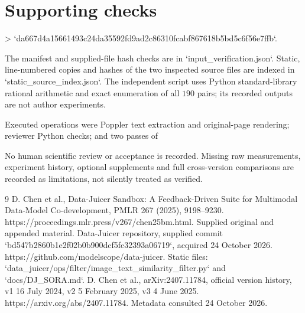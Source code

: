 \documentclass[10pt]{article}
\begin{document}
\section*{Supporting checks}
> `da667d4a15661493c24da35592fd9ad2c86310fcabf867618b5bd5c6f56e7ffb`.\par
The manifest and supplied-file hash checks are in `input\_verification.json`. Static, line-numbered copies and hashes of the two inspected source files are indexed in `static\_source\_index.json`. The independent script uses Python standard-library rational arithmetic and exact enumeration of all \(190\) pairs; its recorded outputs are not author experiments.\par
Executed operations were Poppler text extraction and original-page rendering; reviewer Python checks; and two passes of\par
No human scientific review or acceptance is recorded. Missing raw measurements, experiment history, optional supplements and full cross-version comparisons are recorded as limitations, not silently treated as verified.\par
9 D. Chen et al., Data-Juicer Sandbox: A Feedback-Driven Suite for Multimodal Data-Model Co-development, PMLR 267 (2025), 9198–9230. https://proceedings.mlr.press/v267/chen25bm.html. Supplied original and appended material. Data-Juicer repository, supplied commit `bd547b2860b1e2f02b0b900dcf5fc32393a06719`, acquired 24 October 2026. https://github.com/modelscope/data-juicer. Static files: `data\_juicer/ops/filter/image\_text\_similarity\_filter.py` and `docs/DJ\_SORA.md`. D. Chen et al., arXiv:2407.11784, official version history, v1 16 July 2024, v2 5 February 2025, v3 4 June 2025. https://arxiv.org/abs/2407.11784. Metadata consulted 24 October 2026.\par
\end{document}
